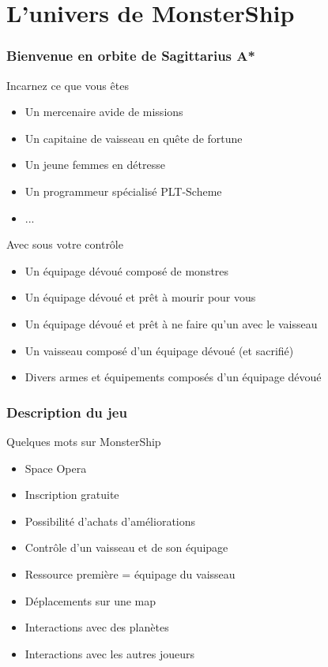 \documentclass{beamer}
\begin{document}
	\section{L'univers de MonsterShip}
		\begin{frame}
			\frametitle{Bienvenue en orbite de Sagittarius A*}
			\begin{block}{Incarnez ce que vous êtes}
				\begin{itemize}
					\item Un mercenaire avide de missions
					\item Un capitaine de vaisseau en quête de fortune
					\item Un jeune femmes en détresse
					\item Un programmeur spécialisé PLT-Scheme
					\item ...
				\end{itemize}
			\end{block}
			
			\begin{block}{Avec sous votre contrôle}
				\begin{itemize}
					\item Un équipage dévoué composé de monstres
					\item Un équipage dévoué et prêt à mourir pour vous
					\item Un équipage dévoué et prêt à ne faire qu'un avec le vaisseau
					\item Un vaisseau composé d'un équipage dévoué (et sacrifié)
					\item Divers armes et équipements composés d'un équipage dévoué
				\end{itemize}
			\end{block}
		\end{frame}
		
		\begin{frame}
			\frametitle{Description du jeu}
			\begin{block}{Quelques mots sur MonsterShip}
				\begin{itemize}
					\item Space Opera
					\item Inscription gratuite
					\item Possibilité d'achats d'améliorations
					\item Contrôle d'un vaisseau et de son équipage
					\item Ressource première = équipage du vaisseau
					\item Déplacements sur une map
					\item Interactions avec des planètes
					\item Interactions avec les autres joueurs
				\end{itemize}
			\end{block}
		\end{frame}
		
\end{document}
